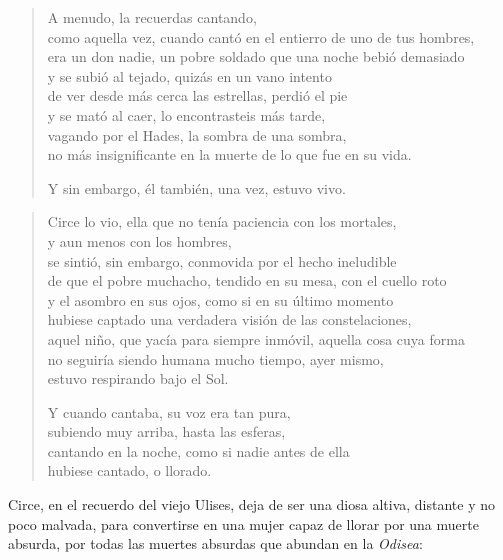 \begin{verse}
A menudo, la recuerdas cantando,\\
como aquella vez, cuando cantó en el entierro de uno de tus hombres,\\
era un don nadie, un pobre soldado que una noche bebió demasiado\\
y se subió al tejado, quizás en un vano intento\\
de ver desde más cerca las estrellas, perdió el pie\\
y se mató al caer, lo encontrasteis más tarde,\\
vagando por el Hades, la sombra de una sombra,\\
no más insignificante en la muerte de lo que fue en su vida.

Y sin embargo, él también, una vez, estuvo vivo.
\end{verse}

\begin{verse}
Circe lo vio, ella que no tenía paciencia con los mortales,\\
y aun menos con los hombres,\\
se sintió, sin embargo, conmovida por el hecho ineludible\\
de que el pobre muchacho, tendido en su mesa, con el cuello roto\\
y el asombro en sus ojos, como si en su último momento\\
hubiese captado una verdadera visión de las constelaciones,\\
aquel niño, que yacía para siempre inmóvil, aquella cosa cuya forma\\
no seguiría siendo humana mucho tiempo, ayer mismo,\\
estuvo respirando bajo el Sol.

Y cuando cantaba, su voz era tan pura,\\
subiendo muy arriba, hasta las esferas,\\
cantando en la noche, como si nadie antes de ella\\
hubiese cantado, o llorado.
\end{verse}

Circe, en el recuerdo del viejo Ulises, deja de ser una diosa altiva, distante y no poco malvada, para convertirse en una mujer capaz de llorar por una muerte absurda, por todas las muertes absurdas que abundan en la \emph{Odisea}:

